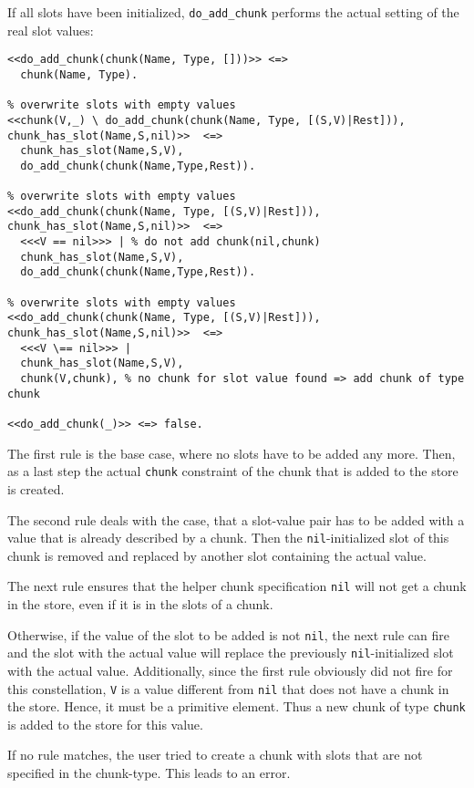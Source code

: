 If all slots have been initialized, \lstinline|do_add_chunk| performs the actual setting of the real slot values:
  
\begin{lstlisting}[caption={Additional rules for adding chunks}]  
% base case
<<do_add_chunk(chunk(Name, Type, []))>> <=> 
  chunk(Name, Type). 

% overwrite slots with empty values
<<chunk(V,_) \ do_add_chunk(chunk(Name, Type, [(S,V)|Rest])), chunk_has_slot(Name,S,nil)>>  <=>
  chunk_has_slot(Name,S,V), 
  do_add_chunk(chunk(Name,Type,Rest)).

% overwrite slots with empty values  
<<do_add_chunk(chunk(Name, Type, [(S,V)|Rest])), chunk_has_slot(Name,S,nil)>>  <=> 
  <<<V == nil>>> | % do not add chunk(nil,chunk)
  chunk_has_slot(Name,S,V), 
  do_add_chunk(chunk(Name,Type,Rest)).  

% overwrite slots with empty values  
<<do_add_chunk(chunk(Name, Type, [(S,V)|Rest])), chunk_has_slot(Name,S,nil)>>  <=> 
  <<<V \== nil>>> |
  chunk_has_slot(Name,S,V), 
  chunk(V,chunk), % no chunk for slot value found => add chunk of type chunk 
  
<<do_add_chunk(_)>> <=> false.
\end{lstlisting}

The first rule is the base case, where no slots have to be added any more. Then, as a last step the actual \lstinline|chunk| constraint of the chunk that is added to the store is created.

The second rule deals with the case, that a slot-value pair has to be added with a value that is already described by a chunk. Then the \lstinline|nil|-initialized slot of this chunk is removed and replaced by another slot containing the actual value.

The next rule ensures that the helper chunk specification \lstinline|nil| will not get a chunk in the store, even if it is in the slots of a chunk.

Otherwise, if the value of the slot to be added is not \lstinline|nil|, the next rule can fire and the slot with the actual value will replace the previously \lstinline|nil|-initialized slot with the actual value. Additionally, since the first rule obviously did not fire for this constellation, \lstinline|V| is a value different from \lstinline|nil| that does not have a chunk in the store. Hence, it must be a primitive element. Thus a new chunk of type \lstinline|chunk| is added to the store for this value.

If no rule matches, the user tried to create a chunk with slots that are not specified in the chunk-type. This leads to an error.

